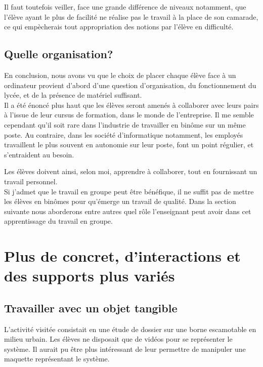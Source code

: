 \documentclass[pdftex,a4paper,12pt]{article}
\begin{document}
	Il faut toutefois veiller, face une grande différence de niveaux notamment,
	que l'élève ayant le plus de facilité ne réalise pas le travail à la place de son camarade, 
	ce qui empècherais tout appropriation des notions par l'élève en difficulté.

	\subsection{Quelle organisation?}
	En conclusion, nous avons vu que le choix de placer chaque élève face à un ordinateur provient d'abord d'une question d'organisation, 
	du fonctionnement du lycée, et de la présence de matériel suffisant.\\

	Il a été énoncé plus haut que les élèves seront amenés à collaborer avec leurs pairs à l'issue de leur cursus de formation, dans le monde de l'entreprise.
	Il me semble cependant qu'il soit rare dans l'industrie de travailler en binôme sur un même poste.
	Au contraire, dans les société d'informatique notamment, les employés travaillent le plus souvent en autonomie sur leur poste, 
	font un point régulier, et s'entraident au besoin.
	
	Les élèves doivent ainsi, selon moi, apprendre à collaborer, tout en fournissant un travail personnel.\\
	
	Si j'admet que le travail en groupe peut être bénéfique, il ne suffit pas de mettre les élèves en binômes pour qu'émerge un travail de qualité.
	Dans la section suivante nous aborderons entre autres quel rôle l'enseignant peut avoir dans cet apprentissage du travail en groupe.

	\section{Plus de concret, d'interactions et des supports plus variés}
	\subsection{Travailler avec un objet tangible}
	L'activité visitée consistait en une étude de dossier sur une borne escamotable en milieu urbain.
	Les élèves ne disposait que de vidéos pour se représenter le système. 
	Il aurait pu être plus intéressant de leur permettre de manipuler une maquette représentant le système.
\end{document}
